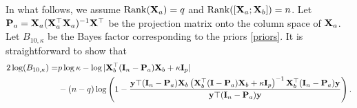 \documentclass[11pt]{article}
\DeclareMathOperator{\myRank}{Rank}
\newcommand{\By}{\mathbf{y}}    \newcommand{\Bz}{\mathbf{z}}
\theoremstyle{plain}
\theoremstyle{definition}
\theoremstyle{remark}
\begin{document}
In what follows, we assume $\myRank (\BX_a )=q$ and $\myRank ([\BX_a;\BX_b])=n$.
Let $\mathbf{P}_a=\mathbf{X}_a(\mathbf{X}_a^\top \mathbf{X}_a)^{-1} \mathbf{X}^\top$ be the projection matrix onto the column space of $\mathbf{X}_a$.
Let $B_{10,\kappa} $ be the Bayes factor corresponding to the priors \eqref{priors}.
 It is straightforward to show that
\begin{equation*}
    \begin{split}
        2\log (B_{10,{\kappa}}) =  &
    p\log \kappa
    -
        \log |\BX_b^\top (\BI_n -\BP_a) \BX_b + \kappa \BI_p |
    \\
    &
    -(n-q)\log \left(
            1-
        \frac{
            \By\top (\BI_n-\BP_a) \BX_b
            \left(\BX_b^\top  (\BI-\BP_a) \BX_b + \kappa \BI_p\right)^{-1}
            \BX_b^\top (\BI_n-\BP_a) \By
        }{
            \By\top (\BI_n-\BP_a) \By
        }
    \right).
    \end{split}
\end{equation*}
\end{document}
